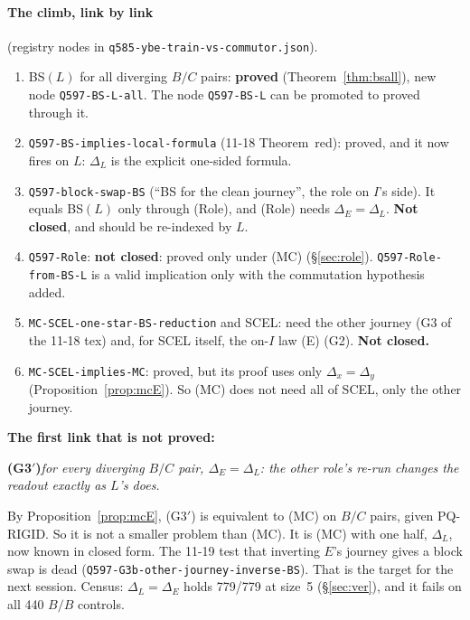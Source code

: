 \documentclass[11pt]{article}
\theoremstyle{definition}\newtheorem{definition}[theorem]{Definition}\newtheorem{remark}[theorem]{Remark}
\begin{document}
\paragraph{The climb, link by link} (registry nodes in \texttt{q585-ybe-train-vs-commutor.json}).
\begin{enumerate}
\item BS$(L)$ for all diverging $B/C$ pairs: \textbf{proved} (Theorem~\ref{thm:bsall}), new node \texttt{Q597-BS-L-all}. The node \texttt{Q597-BS-L} can be promoted to proved through it.
\item \texttt{Q597-BS-implies-local-formula} (11-18 Theorem~red): proved, and it now fires on $L$: $\Delta_L$ is the explicit one-sided formula.
\item \texttt{Q597-block-swap-BS} (``BS for the clean journey'', the role on $I$'s side). It equals BS$(L)$ only through (Role), and (Role) needs $\Delta_E=\Delta_L$. \textbf{Not closed}, and should be re-indexed by $L$.
\item \texttt{Q597-Role}: \textbf{not closed}: proved only under (MC) (\S\ref{sec:role}). \texttt{Q597-Role-from-BS-L} is a valid implication only with the commutation hypothesis added.
\item \texttt{MC-SCEL-one-star-BS-reduction} and SCEL: need the other journey (G3 of the 11-18 tex) and, for SCEL itself, the on-$I$ law (E) (G2). \textbf{Not closed.}
\item \texttt{MC-SCEL-implies-MC}: proved, but its proof uses only $\Delta_x=\Delta_y$ (Proposition~\ref{prop:mcE}). So (MC) does not need all of SCEL, only the other journey.
\end{enumerate}
\textbf{The first link that is not proved:}
\begin{center}
\textbf{(G3$'$)}\quad\emph{for every diverging $B/C$ pair, $\Delta_E=\Delta_L$: the other role's re-run changes the readout exactly as $L$'s does.}
\end{center}
By Proposition~\ref{prop:mcE}, (G3$'$) is equivalent to (MC) on $B/C$ pairs, given PQ-RIGID. So it is not a smaller problem than (MC). It is (MC) with one half, $\Delta_L$, now known in closed form. The 11-19 test that inverting $E$'s journey gives a block swap is dead (\texttt{Q597-G3b-other-journey-inverse-BS}). That is the target for the next session. Census: $\Delta_L=\Delta_E$ holds 779/779 at size~5 (\S\ref{sec:ver}), and it fails on all 440 $B/B$ controls.
\end{document}
